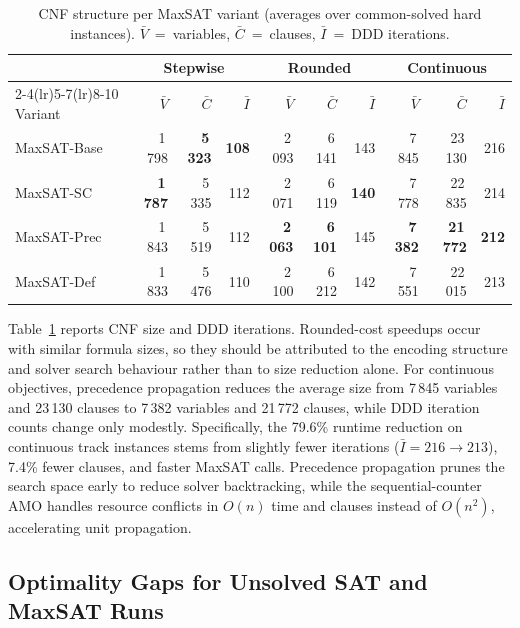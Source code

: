 \documentclass[runningheads]{llncs}
\begin{document}
\begin{table}
\centering
\caption{CNF structure per MaxSAT variant (averages over common-solved hard instances). $\bar V$~=~variables, $\bar C$~=~clauses, $\bar I$~=~DDD iterations.}
\label{tab:ablation-cnf}
\scriptsize
\setlength{\tabcolsep}{3.8pt}
\renewcommand{\arraystretch}{1.0}
\begin{tabular}{lrrrrrrrrr}
\toprule
& \multicolumn{3}{c}{Stepwise} & \multicolumn{3}{c}{Rounded} & \multicolumn{3}{c}{Continuous} \\
\cmidrule(lr){2-4}\cmidrule(lr){5-7}\cmidrule(lr){8-10}
Variant & $\bar V$ & $\bar C$ & $\bar I$ & $\bar V$ & $\bar C$ & $\bar I$ & $\bar V$ & $\bar C$ & $\bar I$ \\
\midrule
MaxSAT-Base & 1\,798 & \textbf{5\,323} & \textbf{108} & 2\,093 & 6\,141 & 143 & 7\,845 & 23\,130 & 216 \\
MaxSAT-SC & \textbf{1\,787} & 5\,335 & 112 & 2\,071 & 6\,119 & \textbf{140} & 7\,778 & 22\,835 & 214 \\
MaxSAT-Prec & 1\,843 & 5\,519 & 112 & \textbf{2\,063} & \textbf{6\,101} & 145 & \textbf{7\,382} & \textbf{21\,772} & \textbf{212} \\
MaxSAT-Def & 1\,833 & 5\,476 & 110 & 2\,100 & 6\,212 & 142 & 7\,551 & 22\,015 & 213 \\
\bottomrule
\end{tabular}
\end{table}

Table~\ref{tab:ablation-cnf} reports CNF size and DDD iterations. Rounded-cost
speedups occur with similar formula sizes, so they should be attributed to the
encoding structure and solver search behaviour rather than to size reduction
alone. For continuous objectives, precedence propagation reduces the average
size from 7\,845 variables and 23\,130 clauses to 7\,382 variables and
21\,772 clauses, while DDD iteration counts change only modestly.
Specifically, the 79.6\% runtime reduction on continuous track instances stems from slightly fewer iterations ($\bar I = 216 \to 213$), 7.4\% fewer clauses, and faster MaxSAT calls. Precedence propagation prunes the search space early to reduce solver backtracking, while the sequential-counter AMO handles resource conflicts in $O(n)$ time and clauses instead of $O(n^2)$, accelerating unit propagation.

\subsection{Optimality Gaps for Unsolved SAT and MaxSAT Runs}
\label{subsec:results-gap}
\end{document}
